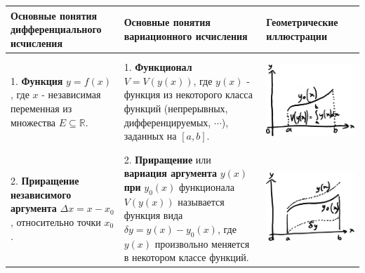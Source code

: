 \documentclass[12pt, a4paper]{article}
\begin{document}
\begin{footnotesize}
\begin{center}
\begin{tabular}{|p{40mm}|p{76mm}|p{35mm}|}
\hline
\textbf{Основные понятия дифференциального исчисления} & \textbf{Основные понятия вариационного исчисления} & \textbf{Геометрические иллюстрации} \\ \hline
1. \textbf{Функция} $y=f(x)$, где $x$ - независимая переменная из множества $E \subseteq \mathbb{R}$. &
1. \textbf{Функционал} $V=V(y(x))$, где $y(x)$ - функция из некоторого класса функций (непрерывных, дифференцируемых, $\cdots$), заданных на $[a, b]$. &
\begin{center} \includegraphics[width=0.9\linewidth]{18} \end{center} \\ \hline
2. \textbf{Приращение независимого аргумента} $\Delta x = x - x_0$, относительно точки $x_0$. &
2. \textbf{Приращение} или \textbf{вариация аргумента} $y(x)$ \textbf{при} $y_0(x)$ функционала $V(y(x))$ называется функция вида $\delta y = y(x) - y_0(x)$, где $y(x)$ произвольно меняется в некотором классе функций. &
\begin{center} \includegraphics[width=0.9\linewidth]{19} \end{center} \\ \hline

\end{tabular}
\end{center}
\end{footnotesize}
\end{document}
